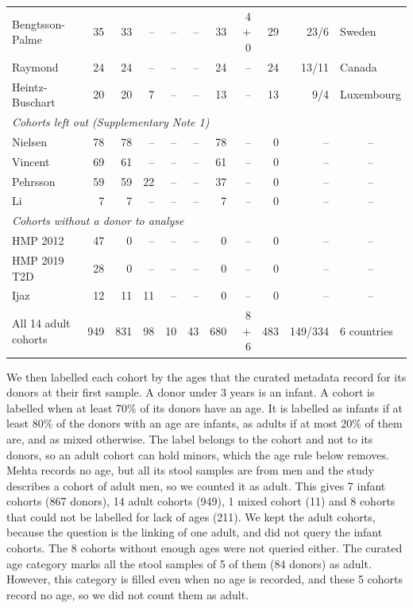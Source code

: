 \documentclass[11pt,a4paper]{article}
\begin{document}
\begin{table}[!htbp]
\begin{tabular}{lrrrrrrrrrl}
Bengtsson-Palme & 35 & 33 & -- & -- & -- & 33 & 4 + 0 & 29 & 23/6 & Sweden \\
Raymond & 24 & 24 & -- & -- & -- & 24 & -- & 24 & 13/11 & Canada \\
Heintz-Buschart & 20 & 20 & 7 & -- & -- & 13 & -- & 13 & 9/4 & Luxembourg \\
\midrule
\multicolumn{11}{l}{\textit{Cohorts left out (Supplementary Note 1)}} \\
Nielsen & 78 & 78 & -- & -- & -- & 78 & -- & 0 & -- & \multicolumn{1}{c}{--} \\
Vincent & 69 & 61 & -- & -- & -- & 61 & -- & 0 & -- & \multicolumn{1}{c}{--} \\
Pehrsson & 59 & 59 & 22 & -- & -- & 37 & -- & 0 & -- & \multicolumn{1}{c}{--} \\
Li & 7 & 7 & -- & -- & -- & 7 & -- & 0 & -- & \multicolumn{1}{c}{--} \\
\midrule
\multicolumn{11}{l}{\textit{Cohorts without a donor to analyse}} \\
HMP 2012 & 47 & 0 & -- & -- & -- & 0 & -- & 0 & -- & \multicolumn{1}{c}{--} \\
HMP 2019 T2D & 28 & 0 & -- & -- & -- & 0 & -- & 0 & -- & \multicolumn{1}{c}{--} \\
Ijaz & 12 & 11 & 11 & -- & -- & 0 & -- & 0 & -- & \multicolumn{1}{c}{--} \\
\midrule
All 14 adult cohorts & 949 & 831 & 98 & 10 & 43 & 680 & 8 + 6 & 483 & 149/334 & 6 countries \\
\bottomrule
\end{tabular}
\end{table}

We then labelled each cohort by the ages that the curated metadata record for its donors at their first sample. A donor under 3 years is an infant. A cohort is labelled when at least 70\% of its donors have an age. It is labelled as infants if at least 80\% of the donors with an age are infants, as adults if at most 20\% of them are, and as mixed otherwise. The label belongs to the cohort and not to its donors, so an adult cohort can hold minors, which the age rule below removes. Mehta records no age, but all its stool samples are from men and the study describes a cohort of adult men\cite{mehta2018}, so we counted it as adult. This gives 7 infant cohorts (867 donors), 14 adult cohorts (949), 1 mixed cohort (11) and 8 cohorts that could not be labelled for lack of ages (211). We kept the adult cohorts, because the question is the linking of one adult, and did not query the infant cohorts. The 8 cohorts without enough ages were not queried either. The curated age category marks all the stool samples of 5 of them (84 donors) as adult. However, this category is filled even when no age is recorded, and these 5 cohorts record no age, so we did not count them as adult.
\end{document}
